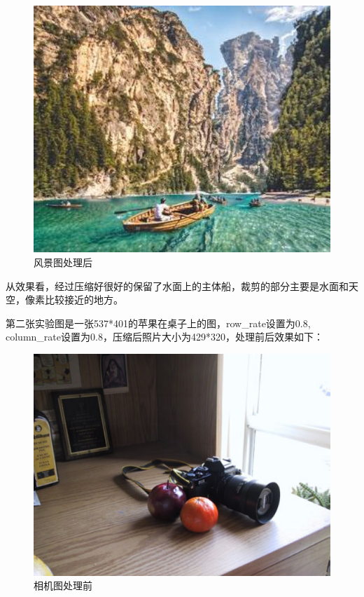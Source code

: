 \documentclass[UTF8]{ctexart}
\begin{document}
\begin{figure}[H]
    \centering
    \includegraphics[width=1\textwidth]{img/output-1.jpg}
    \caption{风景图处理后}
    \label{output-1}
\end{figure}
从效果看，经过压缩好很好的保留了水面上的主体船，裁剪的部分主要是水面和天空，像素比较接近的地方。

第二张实验图是一张537*401的苹果在桌子上的图，row\_rate设置为0.8, column\_rate设置为0.8，压缩后照片大小为429*320，处理前后效果如下：
\begin{figure}[H]
    \centering
    \includegraphics[width=1\textwidth]{img/input-2.png}
    \caption{相机图处理前}
    \label{input-2}
\end{figure}
\end{document}
